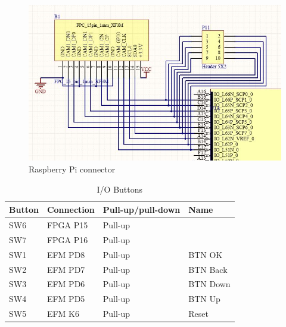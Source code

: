 \begin{figure}
    \includegraphics[width=\linewidth]{img/fpc_header.jpg}
    \caption{Raspberry Pi connector}
    \label{fig:FpcHeader}
\end{figure}

\begin{table}[]
    \centering
    \begin{tabular}{llll}
        Button & Connection & Pull-up/pull-down & Name     \\
        \hline
        SW6    & FPGA P15   & Pull-up          &          \\
        SW7    & FPGA P16   & Pull-up          &          \\
        SW1    & EFM PD8    & Pull-up          & BTN OK   \\
        SW2    & EFM PD7    & Pull-up          & BTN Back \\
        SW3    & EFM PD6    & Pull-up          & BTN Down \\
        SW4    & EFM PD5    & Pull-up          & BTN Up   \\
        SW5    & EFM K6     & Pull-up          & Reset
    \end{tabular}
    \caption{I/O Buttons}
    \label{tab:Buttons}
\end{table}

